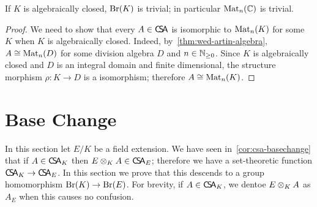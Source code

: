 \begin{theorem}
  If $K$ is algebraically closed, $\operatorname{Br}(K)$ is trivial; in particular $\operatorname{Mat}_{n}(\mathbb{C})$ is trivial.
\end{theorem}
\begin{proof}
  We need to show that every $A\in\operatorname{\mathsf{C}\!\mathsf{S}\!\mathsf{A}}$ is isomorphic to $\operatorname{Mat}_{n}(K)$ for some $K$ when $K$ is algebraically closed. Indeed, by~\cref{thm:wed-artin-algebra}, $A \cong \operatorname{Mat}_{n}(D)$ for some division algebra $D$ and $n\in\mathbb{N}_{\ge0}$. Since $K$ is algebraically closed and $D$ is an integral domain and finite dimensional, the structure morphism $\rho: K\to D$ is a isomorphism; therefore $A\cong \operatorname{Mat}_{n}(K)$.
\end{proof}

\section{Base Change}
In this section let $E/K$ be a field extension. We have seen in~\cref{cor:csa-basechange} that if $A\in\operatorname{\mathsf{C}\!\mathsf{S}\!\mathsf{A}}_{K}$ then $E\otimes_{K}A\in\operatorname{\mathsf{C}\!\mathsf{S}\!\mathsf{A}}_{E}$; therefore we have a set-theoretic function $\operatorname{\mathsf{C}\!\mathsf{S}\!\mathsf{A}}_{K}\to\operatorname{\mathsf{C}\!\mathsf{S}\!\mathsf{A}}_{E}$. In this section we prove that this descends to a group homomorphism $\operatorname{Br}(K)\to\operatorname{Br}(E)$. For brevity, if $A\in \operatorname{\mathsf{C}\!\mathsf{S}\!\mathsf{A}}_{K}$, we dentoe $E\otimes_{K}A$ as $A_{E}$ when this causes no confusion.
